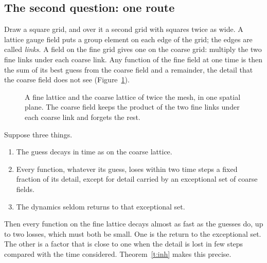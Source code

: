 \subsection{The second question: one route}
Draw a square grid, and over it a second grid with squares twice as wide. A lattice gauge field puts a group
element on each edge of the grid; the edges are called \emph{links}. A field on the fine grid gives one on
the coarse grid: multiply the two fine links under each coarse link. Any function of the fine field at one
time is then the sum of its best guess from the coarse field and a remainder, the detail that the coarse
field does not see (Figure~\ref{f:grid}).

\begin{figure}[htbp]
\centering
{}
\caption{A fine lattice and the coarse lattice of twice the mesh, in one spatial plane. The coarse field
keeps the product of the two fine links under each coarse link and forgets the rest.}\label{f:grid}
\end{figure}

Suppose three things.
\begin{enumerate}
\item[(a)] The guess decays in time as on the coarse lattice.
\item[(b)] Every function, whatever its guess, loses within two time steps a fixed fraction of its detail,
except for detail carried by an exceptional set of coarse fields.
\item[(c)] The dynamics seldom returns to that exceptional set.
\end{enumerate}
Then every function on the fine lattice decays almost as fast as the guesses do, up to two losses, which
must both be small. One is the return to the exceptional set. The other is a factor that is close to one
when the detail is lost in few steps compared with the time considered. Theorem~\ref{t:inh} makes this
precise.

